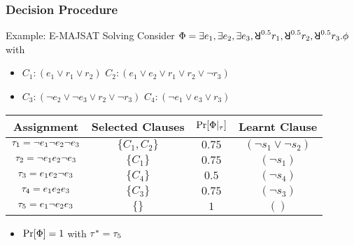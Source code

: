 \begin{frame}
    \frametitle{Decision Procedure}
    \begin{block}{Example: E-MAJSAT Solving}
        Consider $\Qf=\exists e_1,\exists e_2,\exists e_3,\random{0.5} r_1,\random{0.5} r_2,\random{0.5} r_3.\pf$ with
        \begin{itemize}
            \item[] $C_1: (e_1 \lor r_1 \lor r_2)$ $C_2: (e_1 \lor e_2 \lor r_1 \lor r_2 \lor \lnot r_3)$
            \item[] $C_3: (\lnot e_2 \lor \lnot e_3 \lor r_2 \lor \lnot r_3)$ $C_4: (\lnot e_1 \lor e_3 \lor r_3)$
        \end{itemize}
        \pause
        \begin{table}[t]
            \centering
            \small
            \begin{tabular}{c|c|c|c}
                Assignment                            & Selected Clauses & $\Pr[\Phi|_{\tau}]$ & Learnt Clause                \\
                \hline
                $\tau_1=\lnot e_1 \lnot e_2 \lnot e_3$ & $\{C_1,C_2\}$    & $0.75$                 & $(\lnot s_1 \lor \lnot s_2)$ \\
                \pause
                $\tau_2=\lnot e_1 e_2 \lnot e_3$       & $\{C_1\}$        & $0.75$                 & $(\lnot s_1)$                \\
                \pause
                $\tau_3=e_1 e_2 \lnot e_3$             & $\{C_4\}$        & $0.5$                  & $(\lnot s_4)$                \\
                \pause
                $\tau_4=e_1 e_2 e_3$                   & $\{C_3\}$        & $0.75$                 & $(\lnot s_3)$                \\
                \pause
                $\tau_5=e_1 \lnot e_2 e_3$             & $\{\}$           & $1$                    & $()$
            \end{tabular}
        \end{table}
        \pause
        \begin{itemize}
            \item $\Pr[\Phi]=1$ with $\tau^*=\tau_5$
        \end{itemize}
    \end{block}
\end{frame}

